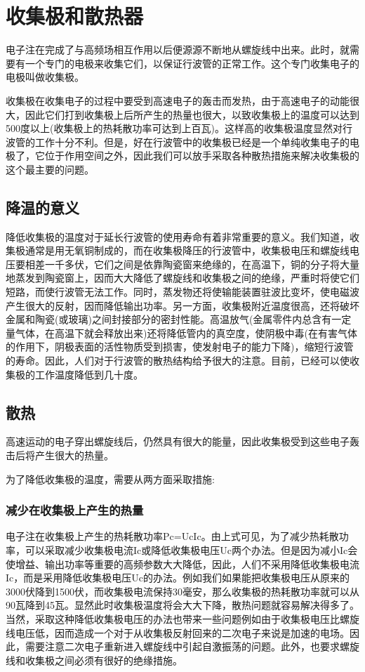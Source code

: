 \chapter{收集极和散热器}
电子注在完成了与高频场相互作用以后便源源不断地从螺旋线中出来。此时，就需要有一个专门的电极来收集它们，以保证行波管的正常工作。这个专门收集电子的电极叫做收集极。


收集极在收集电子的过程中要受到高速电子的轰击而发热，由于高速电子的动能很大，因此它们打到收集极上后所产生的热量也很大，以致收集极上的温度可以达到500度以上(收集极上的热耗散功率可达到上百瓦)。这样高的收集极温度显然对行波管的工作十分不利。但是，好在行波管中的收集极已经是一个单纯收集电子的电极了，它位于作用空间之外，因此我们可以放手采取各种散热措施来解决收集极的这个最主要的问题。

\section{降温的意义}

降低收集极的温度对于延长行波管的使用寿命有着非常重要的意义。我们知道，收集极通常是用无氧铜制成的，而在收集极降压的行波管中，收集极电压和螺旋线电压要相差一千多伏，它们之间是依靠陶瓷窗来绝缘的，在高温下，铜的分子将大量地蒸发到陶瓷窗上，因而大大降低了螺旋线和收集极之间的绝缘，严重时将使它们短路，而使行波管无法工作。同时，蒸发物还将使输能装置驻波比变坏，使电磁波产生很大的反射，因而降低输出功率。另一方面，收集极附近温度很高，还将破坏金属和陶瓷(或玻璃)之间封接部分的密封性能。高温放气(金属零件内总含有一定量气体，在高温下就会释放出来)还将降低管内的真空度，使阴极中毒(在有害气体的作用下，阴极表面的活性物质受到损害，使发射电子的能力下降)，缩短行波管的寿命。因此，人们对于行波管的散热结构给予很大的注意。目前，已经可以使收集极的工作温度降低到几十度。
\section{散热}
高速运动的电子穿出螺旋线后，仍然具有很大的能量，因此收集极受到这些电子轰击后将产生很大的热量。


为了降低收集极的温度，需要从两方面采取措施:


\subsection{减少在收集极上产生的热量}

电子注在收集极上产生的热耗散功率Pc=UcIc。由上式可见，为了减少热耗散功率，可以采取减少收集极电流Ic或降低收集极电压Uc两个办法。但是因为减小Ic会使增益、输出功率等重要的高频参数大大降低，因此，人们不采用降低收集极电流Ic，而是采用降低收集极电压Uc的办法。例如我们如果能把收集极电压从原来的3000伏降到1500伏，而收集极电流保持30毫安，那么收集极的热耗散功率就可以从90瓦降到45瓦。显然此时收集极温度将会大大下降，散热问题就容易解决得多了。当然，采取这种降低收集极电压的办法也带来一些问题例如由于收集极电压比螺旋线电压低，因而造成一个对于从收集极反射回来的二次电子来说是加速的电场。因此，需要注意二次电子重新进入螺旋线中引起自激振荡的问题。此外，也要求螺旋线和收集极之间必须有很好的绝缘措施。

